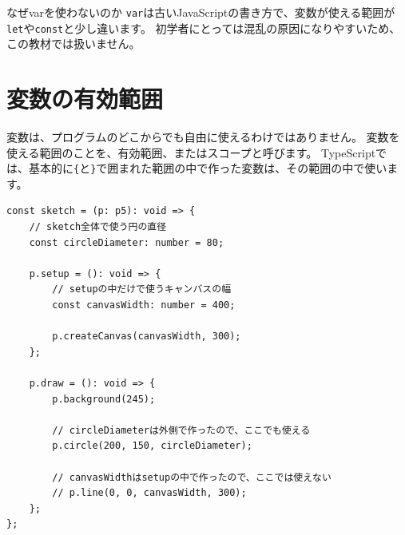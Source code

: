 \begin{notebox}{なぜvarを使わないのか}
\texttt{var}は古いJavaScriptの書き方で、変数が使える範囲が\texttt{let}や\texttt{const}と少し違います。
初学者にとっては混乱の原因になりやすいため、この教材では扱いません。
\end{notebox}

\section{変数の有効範囲}

変数は、プログラムのどこからでも自由に使えるわけではありません。
変数を使える範囲のことを、有効範囲、またはスコープと呼びます。
TypeScriptでは、基本的に\texttt{\{}と\texttt{\}}で囲まれた範囲の中で作った変数は、その範囲の中で使います。

\begin{listing}[htbp]
\begin{verbatim}
const sketch = (p: p5): void => {
    // sketch全体で使う円の直径
    const circleDiameter: number = 80;

    p.setup = (): void => {
        // setupの中だけで使うキャンバスの幅
        const canvasWidth: number = 400;

        p.createCanvas(canvasWidth, 300);
    };

    p.draw = (): void => {
        p.background(245);

        // circleDiameterは外側で作ったので、ここでも使える
        p.circle(200, 150, circleDiameter);

        // canvasWidthはsetupの中で作ったので、ここでは使えない
        // p.line(0, 0, canvasWidth, 300);
    };
};
\end{verbatim}
\caption{変数を使える範囲}
\label{lst:chapter04-variable-scope}
\end{listing}

